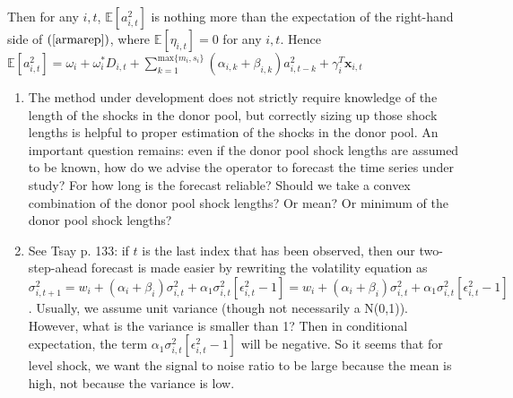 \documentclass[11pt]{article}
\newcommand{\x}{\textbf{x}}
\def\E{\mathbb{E}} %
\theoremstyle{definition}
\begin{document}
Then for any $i,t$, $\E[a^{2}_{i,t}]$ is nothing more than the expectation of the right-hand side of $(\ref{armarep})$, where $\E[\eta_{i,t}] = 0$ for any $i,t$.  Hence $\E[a^{2}_{i,t}] =  \omega_{i} + \omega^{*}_i D_{i,t}  + \sum^{\text{max}\{m_{i},s_{i}\}}_{k=1}(\alpha_{i,k} + \beta_{i,k})a^{2}_{i,t-k} + \gamma_{i}^{T} \x_{i,t}$

\begin{enumerate}
\item The method under development does not strictly require knowledge of the length of the shocks in the donor pool, but correctly sizing up those shock lengths is helpful to proper estimation of the shocks in the donor pool.  An important question remains: even if the donor pool shock lengths are assumed to be known, how do we advise the operator to forecast the time series under study?  For how long is the forecast reliable?  Should we take a convex combination of the donor pool shock lengths?  Or mean? Or minimum of the donor pool shock lengths?

\item See Tsay p. 133: if $t$ is the last index that has been observed, then our two-step-ahead forecast is made easier by rewriting the volatility equation as $\sigma^{2}_{i,t+1} = w_{i} + (\alpha_{i} + \beta_{i})\sigma^{2}_{i,t} + \alpha_{1}\sigma^{2}_{i,t}[\epsilon^{2}_{i,t} - 1]= w_{i} + (\alpha_{i} + \beta_{i})\sigma^{2}_{i,t} + \alpha_{1}\sigma^{2}_{i,t}[\epsilon^{2}_{i,t} - 1] $.  Usually, we assume unit variance (though not necessarily a N(0,1)).  However, what is the variance is smaller than 1?  Then in conditional expectation, the term $\alpha_{1}\sigma^{2}_{i,t}[\epsilon^{2}_{i,t} - 1]$ will be negative.  So it seems that for level shock, we want the signal to noise ratio to be large because the mean is high, not because the variance is low.
\end{enumerate}
\end{document}

